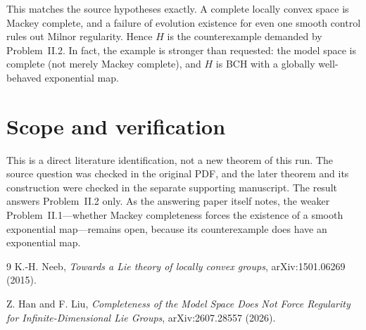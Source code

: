\documentclass[11pt]{article}
\begin{document}
This matches the source hypotheses exactly.  A complete locally convex space
is Mackey complete, and a failure of evolution existence for even one smooth
control rules out Milnor regularity.  Hence $H$ is the counterexample demanded
by Problem~II.2.  In fact, the example is stronger than requested: the model
space is complete (not merely Mackey complete), and $H$ is BCH with a globally
well-behaved exponential map.

\section{Scope and verification}

This is a direct literature identification, not a new theorem of this run.
The source question was checked in the original PDF, and the later theorem
and its construction were checked in the separate supporting manuscript.
The result answers Problem~II.2 only.  As the answering paper itself notes,
the weaker Problem~II.1---whether Mackey completeness forces the existence of
a smooth exponential map---remains open, because its counterexample does have
an exponential map.

\begin{thebibliography}{9}
K.-H. Neeb,
\emph{Towards a Lie theory of locally convex groups},
arXiv:1501.06269 (2015).

Z. Han and F. Liu,
\emph{Completeness of the Model Space Does Not Force Regularity for
Infinite-Dimensional Lie Groups},
arXiv:2607.28557 (2026).
\end{thebibliography}
\end{document}
